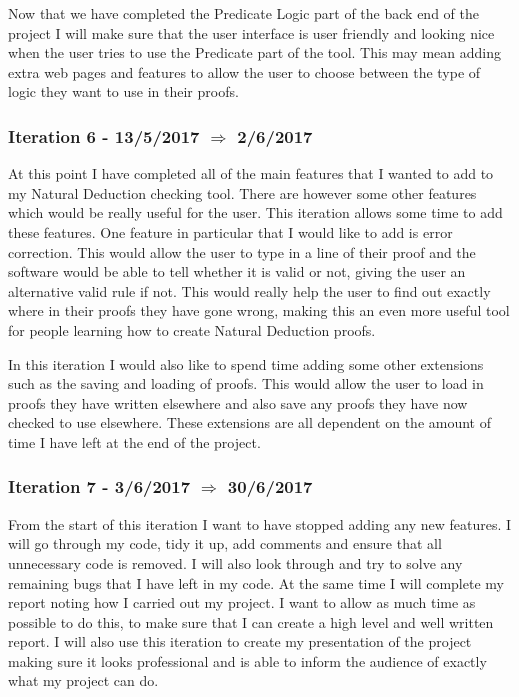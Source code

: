 Now that we have completed the Predicate Logic part of the back end of the project I will make sure that the user interface is user friendly and looking nice when the user tries to use the Predicate part of the tool. This may mean adding extra web pages and features to allow the user to choose between the type of logic they want to use in their proofs.

\subsubsection{Iteration 6 - 13/5/2017 $\Rightarrow$ 2/6/2017}

At this point I have completed all of the main features that I wanted to add to my Natural Deduction checking tool. There are however some other features which would be really useful for the user. This iteration allows some time to add these features. One feature in particular that I would like to add is error correction. This would allow the user to type in a line of their proof and the software would be able to tell whether it is valid or not, giving the user an alternative valid rule if not. This would really help the user to find out exactly where in their proofs they have gone wrong, making this an even more useful tool for people learning how to create Natural Deduction proofs.

In this iteration I would also like to spend time adding some other extensions such as the saving and loading of proofs. This would allow the user to load in proofs they have written elsewhere and also save any proofs they have now checked to use elsewhere. These extensions are all dependent on the amount of time I have left at the end of the project.

\subsubsection{Iteration 7 - 3/6/2017 $\Rightarrow$ 30/6/2017}

From the start of this iteration I want to have stopped adding any new features. I will go through my code, tidy it up, add comments and ensure that all unnecessary code is removed. I will also look through and try to solve any remaining bugs that I have left in my code. At the same time I will complete my report noting how I carried out my project. I want to allow as much time as possible to do this, to make sure that I can create a high level and well written report. I will also use this iteration to create my presentation of the project making sure it looks professional and is able to inform the audience of exactly what my project can do.

